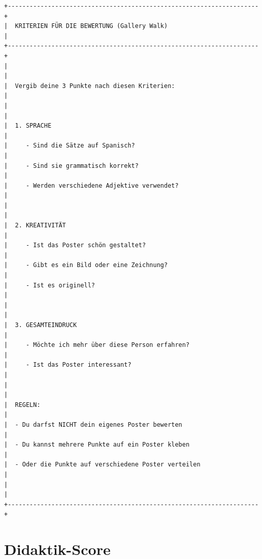 \documentclass[11pt,a4paper]{article}
\begin{document}
\begin{verbatim}
+---------------------------------------------------------------------+
|  KRITERIEN FÜR DIE BEWERTUNG (Gallery Walk)                         |
+---------------------------------------------------------------------+
|                                                                     |
|  Vergib deine 3 Punkte nach diesen Kriterien:                       |
|                                                                     |
|  1. SPRACHE                                                         |
|     - Sind die Sätze auf Spanisch?                                  |
|     - Sind sie grammatisch korrekt?                                 |
|     - Werden verschiedene Adjektive verwendet?                      |
|                                                                     |
|  2. KREATIVITÄT                                                     |
|     - Ist das Poster schön gestaltet?                               |
|     - Gibt es ein Bild oder eine Zeichnung?                         |
|     - Ist es originell?                                             |
|                                                                     |
|  3. GESAMTEINDRUCK                                                  |
|     - Möchte ich mehr über diese Person erfahren?                   |
|     - Ist das Poster interessant?                                   |
|                                                                     |
|  REGELN:                                                            |
|  - Du darfst NICHT dein eigenes Poster bewerten                     |
|  - Du kannst mehrere Punkte auf ein Poster kleben                   |
|  - Oder die Punkte auf verschiedene Poster verteilen                |
|                                                                     |
+---------------------------------------------------------------------+
\end{verbatim}

\newpage
\section{Didaktik-Score}
\end{document}
